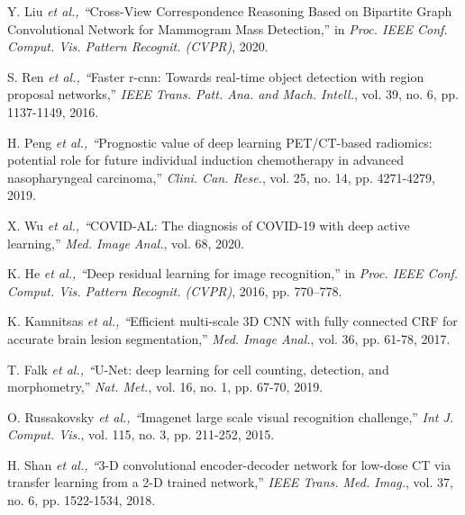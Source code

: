 \documentclass[journal,twoside,web]{ieeecolor}
\begin{document}
 
\begin{thebibliography}{00}









 Y. Liu \emph{et al., ``}Cross-View Correspondence Reasoning Based on Bipartite Graph Convolutional Network for Mammogram Mass Detection,'' in \emph{Proc. IEEE Conf. Comput. Vis. Pattern Recognit. (CVPR)}, 2020.

 S. Ren \emph{et al., ``}Faster r-cnn: Towards real-time object detection with region proposal networks,'' \emph{IEEE Trans. Patt. Ana. and Mach. Intell.}, vol. 39, no. 6,  pp. 1137-1149, 2016.



 H. Peng \emph{et al., ``}Prognostic value of deep learning PET/CT-based radiomics: potential role for future individual induction chemotherapy in advanced nasopharyngeal carcinoma,'' \emph{Clini. Can. Rese.}, vol. 25, no. 14, pp. 4271-4279, 2019.





 X. Wu \emph{et al., ``}COVID-AL: The diagnosis of COVID-19 with deep active learning,'' \emph{Med. Image Anal.}, vol. 68, 2020. 

 K. He \emph{et al., ``}Deep residual learning for image recognition,'' in \emph{Proc. IEEE Conf. Comput. Vis. Pattern Recognit. (CVPR)}, 2016, pp. 770--778.

 K. Kamnitsas \emph{et al., ``}Efficient multi-scale 3D CNN with fully connected CRF for accurate brain lesion segmentation,'' \emph{Med. Image Anal.}, vol. 36, pp. 61-78, 2017. 





 T. Falk \emph{et al., ``}U-Net: deep learning for cell counting, detection, and morphometry,'' \emph{Nat. Met.}, vol. 16, no. 1, pp. 67-70, 2019. 



 O. Russakovsky \emph{et al., ``}Imagenet large scale visual recognition challenge,'' \emph{Int J. Comput. Vis.}, vol. 115, no. 3,  pp. 211-252, 2015. 

 H. Shan \emph{et al., ``}3-D convolutional encoder-decoder network for low-dose CT via transfer learning from a 2-D trained network,'' \emph{IEEE Trans. Med. Imag.}, vol. 37, no. 6,  pp. 1522-1534, 2018.


\end{thebibliography}
\end{document}
